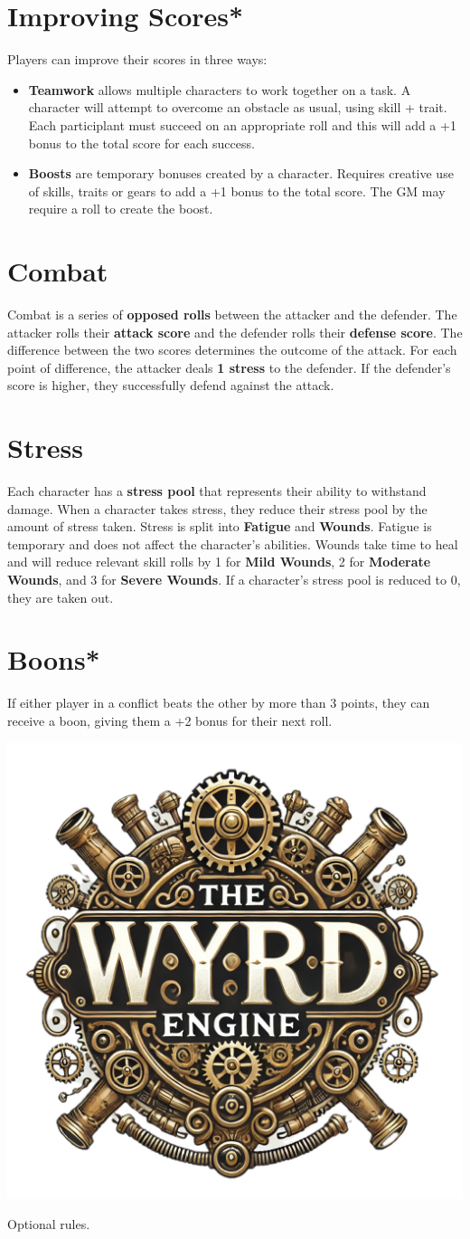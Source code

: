 \documentclass[nodeprecatedcode,bg=print]{dndbook}
\begin{document}
\begin{paracol}{2}
    \section*{Improving Scores*}
    Players can improve their scores in three ways:
    \begin{itemize}
        \item \textbf{Teamwork} allows multiple characters to work together on a task. A character will attempt to overcome an obstacle as usual, using skill + trait. Each participlant must succeed on an appropriate roll and this will add a +1 bonus to the total score for each success.
        \item \textbf{Boosts} are temporary bonuses created by a character. Requires creative use of skills, traits or gears to add a +1 bonus to the total score. The GM may require a roll to create the boost.
    \end{itemize}

    \switchcolumn

    \section*{Combat}
    Combat is a series of \textbf{opposed rolls} between the attacker and the defender. The attacker rolls their \textbf{attack score} and the defender rolls their \textbf{defense score}. The difference between the two scores determines the outcome of the attack. For each point of difference, the attacker deals \textbf{1 stress} to the defender. If the defender's score is higher, they successfully defend against the attack.

    \section*{Stress}
    Each character has a \textbf{stress pool} that represents their ability to withstand damage. When a character takes stress, they reduce their stress pool by the amount of stress taken. Stress is split into \textbf{Fatigue} and \textbf{Wounds}. Fatigue is temporary and does not affect the character's abilities. Wounds take time to heal and will reduce relevant skill rolls by 1 for \textbf{Mild Wounds}, 2 for \textbf{Moderate Wounds}, and 3 for \textbf{Severe Wounds}. If a character's stress pool is reduced to 0, they are taken out.

    \DamageBox[]

    \section*{Boons*}
    If either player in a conflict beats the other by more than 3 points, they can receive a boon, giving them a +2 bonus for their next roll.

\end{paracol}

\vspace*{\fill}
\begin{center}
    \includegraphics[width=.1\textwidth]{img/wyrd-logo}
\end{center}
\vspace*{\fill}

{\small * Optional rules.}
\end{document}
